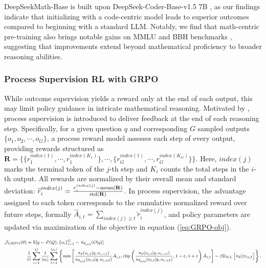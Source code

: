 \begin{itemize}[topsep=0pt]
DeepSeekMath-Base is built upon DeepSeek-Coder-Base-v1.5 7B \citep{deepseek-coder}, as our findings indicate that initializing with a code-centric model leads to superior outcomes compared to beginning with a standard LLM. Notably, we find that math-centric pre-training also brings notable gains on MMLU \citep{mmlu} and BBH benchmarks \citep{bbh}, suggesting that improvements extend beyond mathematical proficiency to broader reasoning abilities.

\subsubsection{Process Supervision RL with GRPO} While outcome supervision yields a reward only at the end of each output, this may limit policy guidance in intricate mathematical reasoning. Motivated by \cite{wang2023math}, process supervision is introduced to deliver feedback at the end of each reasoning step. Specifically, for a given question $q$ and corresponding $G$ sampled outputs $\{o_1, o_2, \cdots, o_G\}$, a process reward model assesses each step of every output, providing rewards structured as $\mathbf{R} = \{ \{r_1^{index(1)},\cdots,r_1^{index(K_1)}\}, \cdots,  \{r_G^{index(1)},\cdots,r_G^{index(K_G)}\} \}$. Here, $index(j)$ marks the terminal token of the $j$-th step and $K_i$ counts the total steps in the $i$-th output. All rewards are normalized by their overall mean and standard deviation: $\widetilde{r}_i^{index(j)} = \frac{r_i^{index(j)} - {\rm mean(\mathbf{R})}}{{\rm std(\mathbf{R})}}$.
In process supervision, the advantage assigned to each token corresponds to the cumulative normalized reward over future steps, formally $\hat{A}_{i, t} = \sum_{index(j) \ge t} \widetilde{r}_i^{index(j)}$,
and policy parameters are updated via maximization of the objective in equation (\ref{eq:GRPO-obj}).

\begin{equation}
\footnotesize
\begin{split}
    \mathcal{J}_{GRPO}(\theta) &= \mathbb{E}{[q \sim P(Q), \{o_i\}_{i=1}^G \sim \pi_{\theta_{old}}(O|q)]}  \\
    & \frac{1}{G}\sum_{i=1}^G\frac{1}{|o_i|} \sum_{t=1}^{|o_i|} \left\{ \min \left[ \frac{\pi_\theta(o_{i,t} | q, o_{i,<t})}{\pi_{\theta_{old}}(o_{i,t} | q, o_{i,<t})} \hat{A}_{i,t}, \text{clip} \left( \frac{\pi_\theta(o_{i,t} | q, o_{i,<t})}{\pi_{\theta_{old}}(o_{i,t} | q, o_{i,<t})}, 1 - \varepsilon, 1 + \varepsilon \right)  \hat{A}_{i,t} \right] - \beta \mathbb{D}_{KL}\left[\pi_{\theta} || \pi_{ref}\right]\right\} ,
\end{split}
\label{eq:GRPO-obj}
\end{equation}


\end{itemize}
